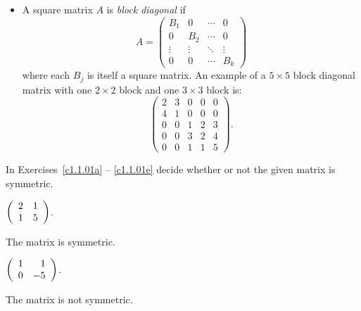 \documentclass{ximera}
\begin{document}
\begin{itemize}
\item A square matrix $A$ is {\em block diagonal\/}
 if
\[
A = \left(\begin{array}{cccc} B_1 & 0 & \cdots & 0 \\
0 & B_2 & \cdots & 0 \\ \vdots & \vdots & \ddots & \vdots \\
0 & 0 & \cdots & B_k \end{array} \right)
\]
where each $B_j$ is itself a square matrix. An example of a $5\times 5$
block diagonal matrix with one $2\times 2$ block and one $3\times 3$ block is:
\[
\left(\begin{array}{ccccc} 2 & 3 & 0 & 0 & 0\\ 4 & 1 & 0 & 0 & 0\\
0 & 0 & 1 & 2 & 3\\ 0 & 0 & 3 & 2 & 4\\ 0 & 0 & 1 & 1 & 5\end{array}\right).
\]


\end{itemize}

\EXER

\TEXER

\noindent In Exercises~\ref{c1.1.01a} -- \ref{c1.1.01e} decide whether or
not the given matrix is symmetric.
\begin{exercise} \label{c1.1.01a}
  $\left(\begin{array}{rr} 2 & 1\\ 1 &5\end{array}\right)$.
  \begin{multipleChoice}
  \end{multipleChoice}

\begin{solution}
The matrix is symmetric.

\end{solution}
\end{exercise}

\begin{exercise} \label{c1.1.01b}
  $\left(\begin{array}{rr} 1 & 1\\ 0 &-5\end{array}\right)$.
  \begin{multipleChoice}
  \end{multipleChoice}  

\begin{solution}
The matrix is not symmetric.

\end{solution}
\end{exercise}
\end{document}
